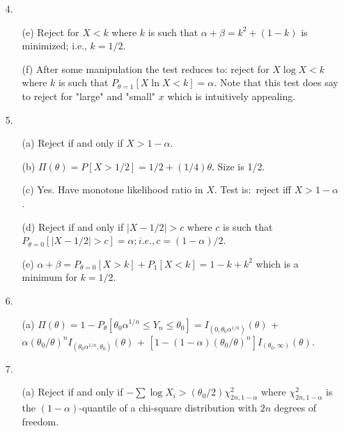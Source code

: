 \begin{enumerate}
	\item[4.] \begin{enumerate}
		\item[(e)] Reject for $X < k$ where $k$ is such that $\alpha + \beta = k^2 + (1-k)$ is minimized; i.e., $k=1/2$.
		\item[(f)] After some manipulation the test reduces to: reject for $X\log X < k$ where $k$ is such that $P_{\theta=1}[X\ln X < k] = \alpha$. Note that this test does say to reject for "large" and "small" $x$ which is intuitively appealing.
	\end{enumerate}

	\item[5.] \begin{enumerate}
		\item[(a)] Reject if and only if $X > 1-\alpha$.
		\item[(b)] $\Pi(\theta) = P[X>1/2] = 1/2 + (1/4)\theta$. Size is 1/2.
		\item[(c)] Yes. Have monotone likelihood ratio in $X$. Test is:\ reject iff $X > 1-\alpha$.

	\newpage
	
		\item[(d)] Reject if and only if $\vert X-1/2\vert > c$ where $c$ is such that $P_{\theta=0}[\vert X-1/2\vert > c] = \alpha; i.e., c = (1-\alpha)/2$.
		\item[(e)] $\alpha +\beta = P_{\theta=0}[X>k] + P_1[X<k] = 1-k+k^2$ which is a minimum for $k=1/2$.
	  \end{enumerate}	
  	
  	\item[6.] \begin{enumerate}
  		\item[(a)] $\Pi(\theta) = 1 - P_\theta[\theta_0\alpha^{1/n} \le Y_n \le \theta_0] = I_{(0,\theta_0\alpha^{1/n})}(\theta)$ + $\alpha(\theta_0/\theta)^nI_{(\theta_0\alpha^{1/n},\theta_0)}(\theta)$ + $[1-(1-\alpha)(\theta_0/\theta)^n]I_{(\theta_0,\infty)}(\theta)$. 
  	\end{enumerate}
  
  	\item[7.] \begin{enumerate}
  		\item[(a)] Reject if and only if $-\sum\log X_i > (\theta_0/2)\chi^2_{2n,1-\alpha}$ where $\chi^2_{2n,1-\alpha}$  is the $(1-\alpha)$-quantile of a chi-square distribution with $2n$ degrees of freedom. 
  	\end{enumerate}
  

\end{enumerate}
